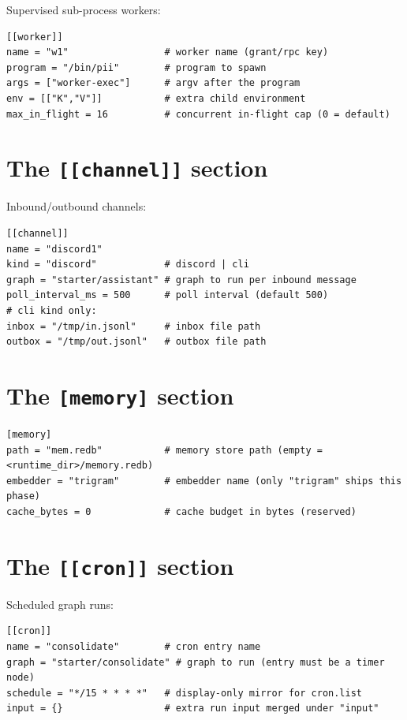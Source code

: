 \documentclass[
	fontsize=10pt,
	twoside=false,
	secnumdepth=2,
	open=any,
]{kaobook}
\begin{document}
Supervised sub-process workers:

\begin{lstlisting}
[[worker]]
name = "w1"                 # worker name (grant/rpc key)
program = "/bin/pii"        # program to spawn
args = ["worker-exec"]      # argv after the program
env = [["K","V"]]           # extra child environment
max_in_flight = 16          # concurrent in-flight cap (0 = default)
\end{lstlisting}

\section{The \texttt{[[channel]]} section}

Inbound/outbound channels:

\begin{lstlisting}
[[channel]]
name = "discord1"
kind = "discord"            # discord | cli
graph = "starter/assistant" # graph to run per inbound message
poll_interval_ms = 500      # poll interval (default 500)
# cli kind only:
inbox = "/tmp/in.jsonl"     # inbox file path
outbox = "/tmp/out.jsonl"   # outbox file path
\end{lstlisting}

\section{The \texttt{[memory]} section}

\begin{lstlisting}
[memory]
path = "mem.redb"           # memory store path (empty = <runtime_dir>/memory.redb)
embedder = "trigram"        # embedder name (only "trigram" ships this phase)
cache_bytes = 0             # cache budget in bytes (reserved)
\end{lstlisting}

\section{The \texttt{[[cron]]} section}

Scheduled graph runs:

\begin{lstlisting}
[[cron]]
name = "consolidate"        # cron entry name
graph = "starter/consolidate" # graph to run (entry must be a timer node)
schedule = "*/15 * * * *"   # display-only mirror for cron.list
input = {}                  # extra run input merged under "input"
\end{lstlisting}
\end{document}
